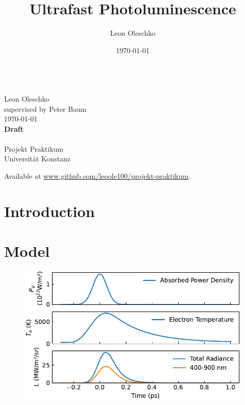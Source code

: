\documentclass[
	parskip=half,
	a4paper,
]{scrarticle}
\begin{document}
\title{Ultrafast Photoluminescence}
\author{Leon Oleschko}
\date{\dotdate\today}

\begin{titlepage}
    \sffamily
    \vspace*{3cm}
    {
        \fontsize{32}{32}
    }
    \vspace{.25cm}\\
    {
        \Large
        Leon Oleschko\\
        supervised by Peter Baum
        \vspace{.05cm}\\
        \dotdate\today\\
        \textbf{Draft}\\
        \vspace{.05cm}\\
        \normalsize
        Projekt Praktikum\\
        Universität Konstanz
    }
    \vfill
    {
        \normalfont\normalsize
    }
    \vfill
    \begin{flushright}
        Available at \url{www.github.com/leoole100/projekt-praktikum}.
    \end{flushright}
\end{titlepage}


\clearpage

\section{Introduction}


\clearpage
\section{Model}
\begin{figure}[b]
    \centering
    \includegraphics{../analysis/figures/model.time_evolution.pdf}
    \caption{}
    \label{fig:timeevolution}
\end{figure}
\end{document}
